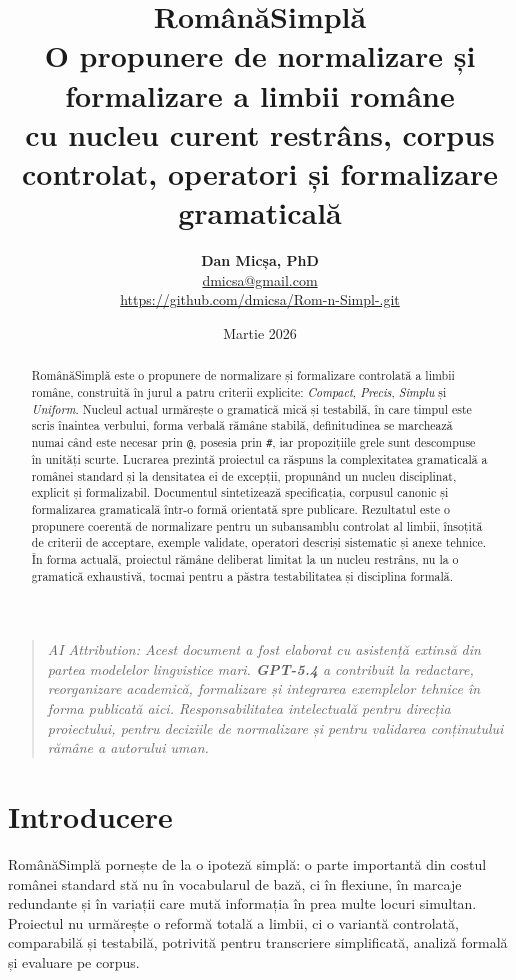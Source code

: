 \documentclass[12pt,onecolumn,letterpaper]{article}
\title{\Huge\textbf{RomânăSimplă}\\[0.2em]
\LARGE O propunere de normalizare și formalizare a limbii române\\[0.35em]
\large cu nucleu curent restrâns, corpus controlat, operatori și formalizare gramaticală}
\author{\textbf{Dan Micșa, PhD}\\
\small \href{mailto:dmicsa@gmail.com}{dmicsa@gmail.com}\\
\small \url{https://github.com/dmicsa/Rom-n-Simpl-.git}}
\date{Martie 2026}
\newcommand{\rs}[1]{\texttt{#1}}
\begin{document}
\maketitle
\thispagestyle{empty}

\begin{quote}
\small\textit{AI Attribution: Acest document a fost elaborat cu asistență extinsă din partea modelelor lingvistice mari. \textbf{GPT-5.4} a contribuit la redactare, reorganizare academică, formalizare și integrarea exemplelor tehnice în forma publicată aici. Responsabilitatea intelectuală pentru direcția proiectului, pentru deciziile de normalizare și pentru validarea conținutului rămâne a autorului uman.}
\end{quote}

\clearpage

\begin{abstract}
RomânăSimplă este o propunere de normalizare și formalizare controlată a limbii române,
construită în jurul a patru criterii explicite: \textit{Compact},
\textit{Precis}, \textit{Simplu} și \textit{Uniform}. Nucleul actual urmărește
o gramatică mică și testabilă, în care timpul este scris înaintea verbului,
forma verbală rămâne stabilă, definitudinea se marchează numai când este
necesar prin \rs{@}, posesia prin \rs{\#}, iar propozițiile grele sunt
descompuse în unități scurte. Lucrarea prezintă proiectul ca răspuns la
complexitatea gramaticală a românei standard și la densitatea ei de excepții,
propunând un nucleu disciplinat, explicit și formalizabil. Documentul sintetizează
specificația, corpusul canonic și formalizarea gramaticală într-o formă orientată
spre publicare. Rezultatul este o propunere coerentă de normalizare pentru un
subansamblu controlat al limbii, însoțită de criterii de acceptare, exemple
validate, operatori descriși sistematic și anexe tehnice. În forma actuală,
proiectul rămâne deliberat limitat la un nucleu restrâns, nu la o gramatică
exhaustivă, tocmai pentru a păstra testabilitatea și disciplina formală.
\end{abstract}

\tableofcontents
\vspace{1em}

\section{Introducere}

RomânăSimplă pornește de la o ipoteză simplă: o parte importantă din costul
românei standard stă nu în vocabularul de bază, ci în flexiune, în marcaje
redundante și în variații care mută informația în prea multe locuri simultan.
Proiectul nu urmărește o reformă totală a limbii, ci o variantă controlată,
comparabilă și testabilă, potrivită pentru transcriere simplificată, analiză
formală și evaluare pe corpus.
\end{document}
